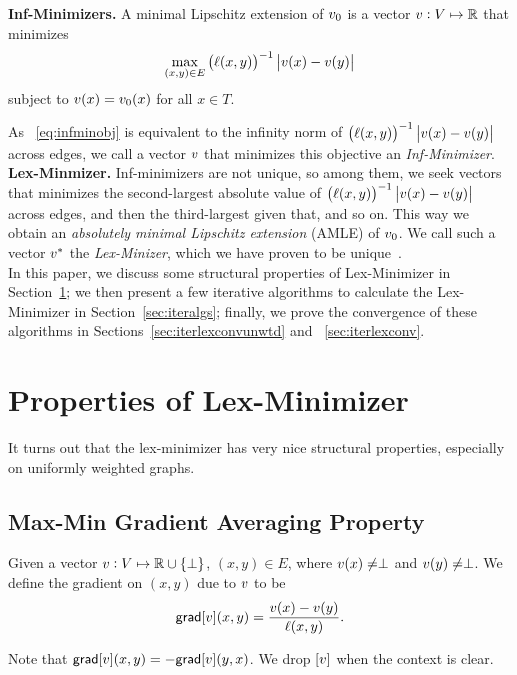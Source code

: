 \documentclass[12pt]{amsart}
\newcommand{\grad}{\ensuremath{\mathsf{grad}}}
\begin{document}
\noindent\textbf{Inf-Minimizers.}
A minimal Lipschitz extension of $v_0$ is a vector $v: V\mapsto \mathbb R$ that minimizes
\begin{equation}\label{eq:infminobj}
  \max_{(x,y)\in E} \left({ \ell(x,y)}\right)^{-1} \left| v(x)-v(y) \right|
\end{equation}
subject to $v(x) = v_0(x)$ for all $x\in T$.

As ~\eqref{eq:infminobj} is equivalent to the infinity norm of $\left({ \ell(x,y)}\right)^{-1} \left| v(x)-v(y) \right|$ across edges, we call a vector $v$ that minimizes this objective an \emph{Inf-Minimizer}.\\

\noindent\textbf{Lex-Minmizer.}
Inf-minimizers are not unique, so among them, we seek vectors that minimizes the second-largest absolute value of $\left({ \ell(x,y)}\right)^{-1} \left| v(x)-v(y) \right|$ across edges, and then the third-largest given that, and so on. This way we obtain an \emph{absolutely minimal Lipschitz extension} (AMLE) of $v_0$. We call such a vector $v^*$ the \emph{Lex-Minizer}, which we have proven to be unique~\cite{KRSS15}. \\

In this paper, we discuss some structural properties of Lex-Minimizer in Section~\ref{sec:lexproperties}; we then present a few iterative algorithms to calculate the Lex-Minimizer in Section~\ref{sec:iteralgs}; finally, we prove the convergence of these algorithms in Sections~\ref{sec:iterlexconvunwtd} and ~\ref{sec:iterlexconv}.


\section{Properties of Lex-Minimizer}\label{sec:lexproperties}
It turns out that the lex-minimizer has very nice structural properties, especially on uniformly weighted graphs.

\subsection{Max-Min Gradient Averaging Property}

\begin{definition}\label{def:grad}
Given a vector $v: V\mapsto \mathbb R \cup \left\{\perp\right\}$, $(x,y)\in E$, where $v(x)\neq \perp$ and $v(y)\neq\perp$. We define the gradient on $(x,y)$ due to $v$ to be
$$\grad[\V{v}](x,y) = \frac{\V{v}(x)-\V{v}(y)}{\ell(x,y)}.$$
\end{definition}
Note that $\grad[\V{v}](x,y) = -\grad[\V{v}](y,x)$. We drop $[v]$ when the context is clear.
\end{document}
